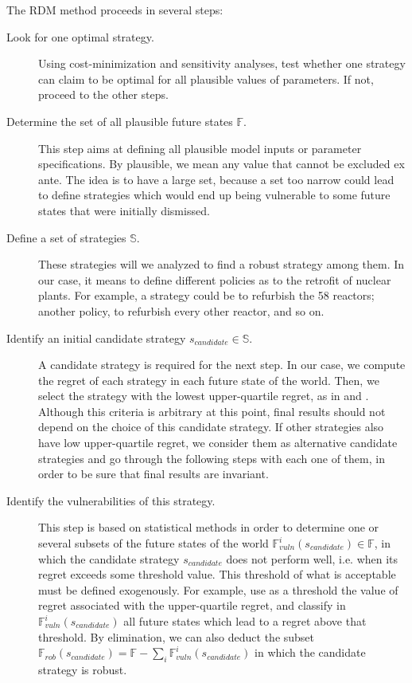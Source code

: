 The RDM method proceeds in several steps:
\begin{description}
	
	\item[Look for one optimal strategy.] Using cost-minimization and sensitivity analyses, test whether one strategy can claim to be optimal for all plausible values of parameters. If not, proceed to the other steps.
	
	\item [Determine the set of all plausible future states $\mathbb{F}$.] This step aims at defining all plausible model inputs or parameter specifications. By plausible, we mean any value that cannot be excluded ex ante. The idea is to have a large set, because a set too narrow could lead to define strategies which would end up being vulnerable to some future states that were initially dismissed.
	
	\item [Define a set of strategies $\mathbb{S}$.] These strategies will we analyzed to find a robust strategy among them. In our case, it means to define different policies as to the retrofit of nuclear plants. For example, a strategy could be to refurbish the 58 reactors; another policy, to refurbish every other reactor, and so on.
	
	\item [Identify an initial candidate strategy $s_{candidate} \in \mathbb{S}$.] A candidate strategy is required for the next step. In our case, we compute the regret of each strategy in each future state of the world. Then, we select the strategy with the lowest upper-quartile regret, as in \citet{Lempert2006} and \citet{Nahmmacher2016}. Although this criteria is arbitrary at this point, final results should not depend on the choice of this candidate strategy. If other strategies also have low upper-quartile regret, we consider them as alternative candidate strategies and go through the following steps with each one of them, in order to be sure that final results are invariant.
	
	\item [Identify the vulnerabilities of this strategy.] This step is based on statistical methods in order to determine one or several subsets of the future states of the world $\mathbb{F}^i_{vuln}(s_{candidate}) \in \mathbb{F}$, in which the candidate strategy $s_{candidate}$ does not perform well, i.e. when its regret exceeds some threshold value. This threshold of what is acceptable must be defined exogenously. For example, \citet{Nahmmacher2016} use as a threshold the value of regret associated with the upper-quartile regret, and classify in $\mathbb{F}^i_{vuln}(s_{candidate})$ all future states which lead to a regret above that threshold.
	By elimination, we can also deduct the subset $\mathbb{F}_{rob}(s_{candidate}) = \mathbb{F} - \sum_i \mathbb{F}^i_{vuln}(s_{candidate})$ in which the candidate strategy is robust.
	

\end{description}
